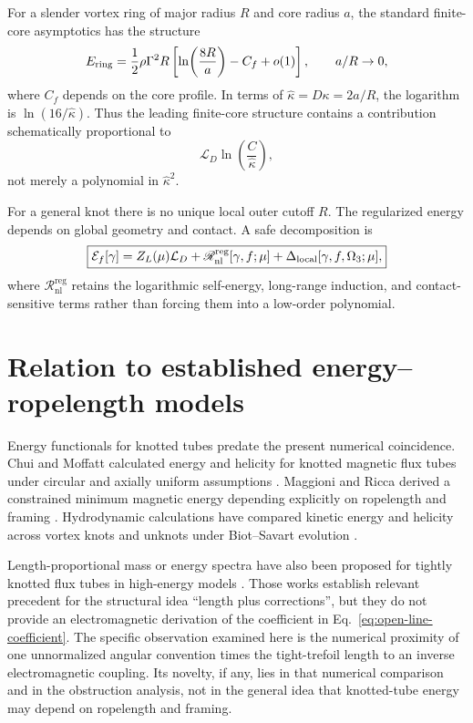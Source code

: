 \documentclass[aps,pre,preprint,notitlepage,nofootinbib,superscriptaddress]{revtex4-2}
\newcommand{\calL}{\mathcal L}
\newcommand{\calE}{\mathcal E}
\newcommand{\ZL}{Z_L}
\newcommand{\Rnl}{\mathscr R_{\mathrm{nl}}^{\mathrm{reg}}}
\begin{document}
For a slender vortex ring of major radius $R$ and core radius $a$, the standard finite-core asymptotics has the structure \cite{Saffman1992}
\begin{equation}
  E_{\rm ring}
  =\frac12\rho\Gamma^2R
   \left[\ln\!\left(\frac{8R}{a}\right)-C_f+o(1)\right],
  \qquad a/R\to0,
  \label{eq:ring-log}
\end{equation}
where $C_f$ depends on the core profile.  In terms of $\widehat\kappa=D\kappa=2a/R$, the logarithm is $\ln(16/\widehat\kappa)$.  Thus the leading finite-core structure contains a contribution schematically proportional to
\begin{equation}
  \calL_D\ln\!\left(\frac{C}{\widehat\kappa}\right),
  \label{eq:log-line-term}
\end{equation}
not merely a polynomial in $\widehat\kappa^2$.

For a general knot there is no unique local outer cutoff $R$.  The regularized energy depends on global geometry and contact.  A safe decomposition is
\begin{equation}
  \boxed{
  \calE_f[\gamma]
  =\ZL(\mu)\calL_D
  +\Rnl[\gamma,f;\mu]
  +\Delta_{\rm local}[\gamma,f,\Omega_3;\mu],}
  \label{eq:safe-decomposition}
\end{equation}
where $\Rnl$ retains the logarithmic self-energy, long-range induction, and contact-sensitive terms rather than forcing them into a low-order polynomial.

\section{Relation to established energy--ropelength models}
\label{sec:prior-art}

Energy functionals for knotted tubes predate the present numerical coincidence.  Chui and Moffatt calculated energy and helicity for knotted magnetic flux tubes under circular and axially uniform assumptions \cite{ChuiMoffatt1995}.  Maggioni and Ricca derived a constrained minimum magnetic energy depending explicitly on ropelength and framing \cite{MaggioniRicca2009}.  Hydrodynamic calculations have compared kinetic energy and helicity across vortex knots and unknots under Biot--Savart evolution \cite{MaggioniEtAl2009,MaggioniEtAl2010}.

Length-proportional mass or energy spectra have also been proposed for tightly knotted flux tubes in high-energy models \cite{BuniyKephart2005,BuniyEtAl2014}.  Those works establish relevant precedent for the structural idea ``length plus corrections'', but they do not provide an electromagnetic derivation of the coefficient in Eq.~\eqref{eq:open-line-coefficient}.  The specific observation examined here is the numerical proximity of one unnormalized angular convention times the tight-trefoil length to an inverse electromagnetic coupling.  Its novelty, if any, lies in that numerical comparison and in the obstruction analysis, not in the general idea that knotted-tube energy may depend on ropelength and framing.
\end{document}

